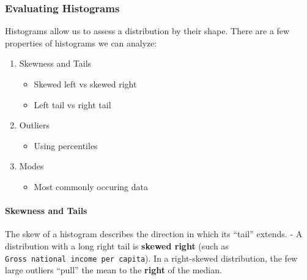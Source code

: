 \documentclass[
  letterpaper,
  DIV=11,
  numbers=noendperiod]{scrreprt}
\let\oldparagraph\paragraph
\renewcommand{\paragraph}[1]{\oldparagraph{#1}\mbox{}}
\newenvironment{Shaded}{\begin{snugshade}}{\end{snugshade}}
\newcommand{\NormalTok}[1]{\textcolor[rgb]{0.00,0.23,0.31}{#1}}
\newcommand{\OperatorTok}[1]{\textcolor[rgb]{0.37,0.37,0.37}{#1}}
\newcommand{\StringTok}[1]{\textcolor[rgb]{0.13,0.47,0.30}{#1}}
\providecommand{\tightlist}{%
  \setlength{\itemsep}{0pt}\setlength{\parskip}{0pt}}\usepackage{longtable,booktabs,array}
\begin{document}
\subsubsection{Evaluating Histograms}\label{evaluating-histograms}

Histograms allow us to assess a distribution by their shape. There are a
few properties of histograms we can analyze:

\begin{enumerate}
\def\labelenumi{\arabic{enumi}.}
\tightlist
\item
  Skewness and Tails

  \begin{itemize}
  \tightlist
  \item
    Skewed left vs skewed right
  \item
    Left tail vs right tail
  \end{itemize}
\item
  Outliers

  \begin{itemize}
  \tightlist
  \item
    Using percentiles
  \end{itemize}
\item
  Modes

  \begin{itemize}
  \tightlist
  \item
    Most commonly occuring data
  \end{itemize}
\end{enumerate}

\paragraph{Skewness and Tails}\label{skewness-and-tails}

The skew of a histogram describes the direction in which its ``tail''
extends. - A distribution with a long right tail is \textbf{skewed
right} (such as \texttt{Gross\ national\ income\ per\ capita}). In a
right-skewed distribution, the few large outliers ``pull'' the mean to
the \textbf{right} of the median.

\begin{Shaded}
\end{Shaded}
\end{document}

